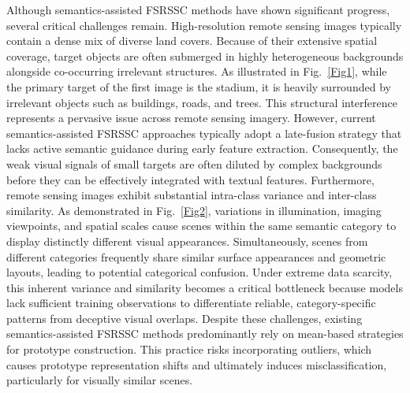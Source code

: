 \documentclass[lettersize,journal]{IEEEtran}
\begin{document}
Although semantics-assisted FSRSSC methods have shown significant progress, several critical challenges remain. 
High-resolution remote sensing images typically contain a dense mix of diverse land covers. 
Because of their extensive spatial coverage, target objects are often submerged in highly heterogeneous backgrounds alongside co-occurring irrelevant structures. 
As illustrated in Fig.~\ref{Fig1}, while the primary target of the first image is the stadium, it is heavily surrounded by irrelevant objects such as buildings, roads, and trees. 
This structural interference represents a pervasive issue across remote sensing imagery. 
However, current semantics-assisted FSRSSC approaches \cite{CNSPN,TeAw,ProDFSL} typically adopt a late-fusion strategy that lacks active semantic guidance during early feature extraction. 
Consequently, the weak visual signals of small targets are often diluted by complex backgrounds before they can be effectively integrated with textual features. 
Furthermore, remote sensing images exhibit substantial intra-class variance and inter-class similarity. 
As demonstrated in Fig.~\ref{Fig2}, variations in illumination, imaging viewpoints, and spatial scales cause scenes within the same semantic category to display distinctly different visual appearances. 
Simultaneously, scenes from different categories frequently share similar surface appearances and geometric layouts, leading to potential categorical confusion. 
Under extreme data scarcity, this inherent variance and similarity becomes a critical bottleneck because models lack sufficient training observations to differentiate reliable, category-specific patterns from deceptive visual overlaps. 
Despite these challenges, existing semantics-assisted FSRSSC methods \cite{CNSPN,TeAw,ProDFSL} predominantly rely on mean-based strategies for prototype construction. 
This practice risks incorporating outliers, which causes prototype representation shifts and ultimately induces misclassification, particularly for visually similar scenes.
\end{document}
